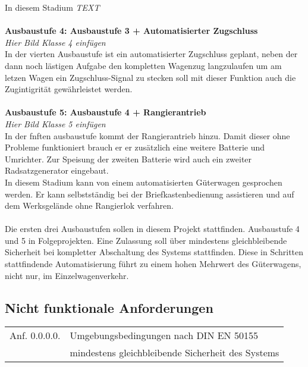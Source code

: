 In diesem Stadium \textit{TEXT}\\\\
\textbf{Ausbaustufe 4: Ausbaustufe 3 + Automatisierter Zugschluss}\\
\textit{Hier Bild Klasse 4 einfügen}\\
In der vierten Ausbaustufe ist ein automatisierter Zugschluss geplant, neben der dann noch lästigen Aufgabe den kompletten Wagenzug langzulaufen um am letzen Wagen ein Zugschluss-Signal zu stecken soll mit dieser Funktion auch die Zugintigrität gewährleistet werden.\\\\
\textbf{Ausbaustufe 5: Ausbaustufe 4 + Rangierantrieb}\\
\textit{Hier Bild Klasse 5 einfügen}\\
In der fnften ausbaustufe kommt der Rangierantrieb hinzu. Damit dieser ohne Probleme funktioniert brauch er er zusätzlich eine weitere Batterie und Umrichter. Zur Speisung der zweiten Batterie wird auch ein zweiter Radsatzgenerator eingebaut.\\
In diesem Stadium kann von einem automatisierten Güterwagen gesprochen werden. Er kann selbstständig bei der Briefkastenbedienung assistieren und auf dem Werksgelände ohne Rangierlok verfahren.\\\\
Die ersten drei Ausbaustufen sollen in diesem Projekt stattfinden. Ausbaustufe 4 und 5 in Folgeprojekten. Eine Zulassung soll über mindestens gleichbleibende Sicherheit bei kompletter Abschaltung des Systems stattfinden. Diese in Schritten stattfindende Automatisierung führt zu einem hohen Mehrwert des Güterwagens, nicht nur, im Einzelwagenverkehr.
\subsection{Nicht funktionale Anforderungen}
\begin{tabular}{r|l}
	\hline
	Anf. 0.0.0.0.	& 	Umgebungsbedingungen nach DIN EN 50155\\
					& 	mindestens gleichbleibende Sicherheit des Systems\\
	
	\hline
\end{tabular} \\
